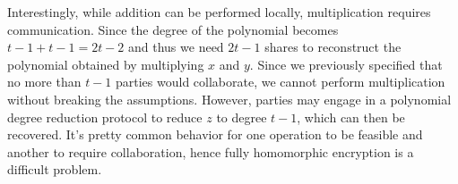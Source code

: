 Interestingly, while addition can be performed locally, 
multiplication requires communication. Since the degree 
of the polynomial becomes $t - 1 + t - 1 = 2t - 2$ and 
thus we need $2t - 1$ shares to reconstruct the 
polynomial obtained by multiplying $x$ and $y$. Since 
we previously specified that no more than $t - 1$ parties 
would collaborate, we cannot perform multiplication
without breaking the assumptions. However, parties 
may engage in a polynomial degree reduction protocol 
to reduce $z$ to degree $t-1$, which can then be 
recovered. It's pretty common behavior for one 
operation to be feasible and another to require collaboration, 
hence fully homomorphic encryption is a difficult problem. 